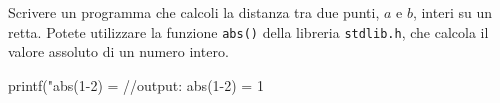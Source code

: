 \begin{Exercise}[label={ex:distanza_abs}]
  Scrivere un programma che calcoli la distanza tra due punti, $a$ e $b$, interi su un retta. Potete utilizzare la funzione \texttt{abs()} della libreria \texttt{stdlib.h}, che calcola il valore assoluto di un numero intero.

  \begin{clang}
    printf("abs(1-2) = %
    //output: abs(1-2) = 1
  \end{clang}
\end{Exercise}

\begin{Answer}[ref={ex:distanza_abs}]
    
\end{Answer}